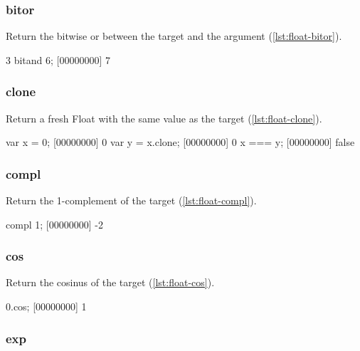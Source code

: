\subsubsection{bitor}

Return the bitwise or between the target and the argument (\autoref{lst:float-bitor}).

\begin{urbiscript}[caption=Float.bitor, label=lst:float-bitor,
  float=\floatposh]
3 bitand 6;
[00000000] 7
\end{urbiscript}

\subsubsection{clone}

Return a fresh Float with the same value as the target (\autoref{lst:float-clone}).

\begin{urbiscript}[caption=Float.clone, label=lst:float-clone,
  float=\floatposh]
var x = 0;
[00000000] 0
var y = x.clone;
[00000000] 0
x === y;
[00000000] false
\end{urbiscript}

\subsubsection{compl}

Return the 1-complement of the target (\autoref{lst:float-compl}).

\begin{urbiscript}[caption=Float.compl, label=lst:float-compl,
  float=\floatposh]
compl 1;
[00000000] -2
\end{urbiscript}

\subsubsection{cos}

Return the cosinus of the target (\autoref{lst:float-cos}).

\begin{urbiscript}[caption=Float.cos, label=lst:float-cos,
  float=\floatposh]
0.cos;
[00000000] 1
\end{urbiscript}

\subsubsection{exp}

